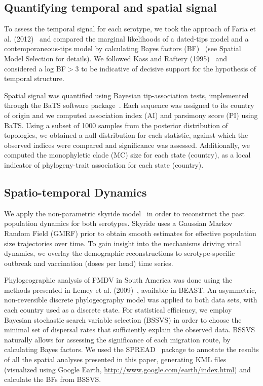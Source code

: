 \documentclass[10pt]{article}
\begin{document}
\subsection*{Quantifying temporal and spatial signal} 

To assess the temporal signal for each serotype, we took the approach of Faria et al. (2012)~\cite{Faria2012} and compared the marginal likelihoods of a dated-tips model and a contemporaneous-tips model by calculating Bayes factors (BF)~\cite{Suchard2001, suchard2005models} (see Spatial Model Selection for details).
We followed Kass and Raftery (1995)~\cite{KassRaftery1995} and considered a log BF$>$3 to be indicative of decisive support for the hypothesis of temporal structure.

Spatial signal was quantified using Bayesian tip-association tests, implemented through the BaTS software package~\cite{bats}.
Each sequence was assigned to its country of origin and we computed association index (AI) and parsimony score (PI) using BaTS.
Using a subset of 1000 samples from the posterior distribution of topologies, we obtained a null distribution for each statistic, against which the observed indices were compared and significance was assessed.
Additionally, we computed the monophyletic clade (MC) size for each state (country), as a local indicator of phylogeny-trait association for each state (country).


\subsection*{Spatio-temporal Dynamics}

We apply the non-parametric skyride model~\cite{skyride} in order to reconstruct the past population dynamics for both serotypes.
Skyride uses a Gaussian Markov Random Field (GMRF) prior to obtain smooth estimates for effective population size trajectories over time.
To gain insight into the mechanisms driving viral dynamics, we overlay the demographic reconstructions to serotype-specific outbreak and vaccination (doses per head) time series.

Phylogeographic analysis of FMDV in South America was done using the methods presented in Lemey et al. (2009)~\cite{roots}, available in BEAST. 
An asymmetric, non-reversible discrete phylogeography model was applied to both data sets, with each country used as a discrete state.
For statistical efficiency, we employ Bayesian stochastic search variable selection (BSSVS) in order to choose the minimal set of dispersal rates that sufficiently explain the observed data.
BSSVS naturally allows for assessing the significance of each migration route, by calculating Bayes factors.
We used the SPREAD~\cite{spread} package to annotate the results of all the spatial analyses presented in this paper, generating KML files (visualized using Google Earth, \url{http://www.google.com/earth/index.html}) and calculate the BFs from BSSVS.
\end{document}
